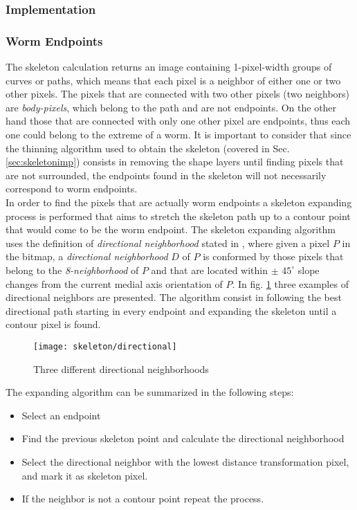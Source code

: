 \subsubsection{Implementation}
\label{segmentimp}


\subsubsection*{Worm Endpoints}
\label{sec:wend}
The skeleton calculation returns an image 
containing 1-pixel-width groups of curves or paths, which means that each pixel 
is a neighbor of either one or two other pixels. The pixels that are connected with 
two other pixels (two neighbors) are \emph{body-pixels}, which belong 
to the path and are not endpoints. On the other hand those that are connected with 
only one other pixel are endpoints, thus each one could belong to the extreme of a
worm. It is important to consider that since the thinning algorithm used to obtain
the skeleton (covered in Sec. \ref{sec:skeletonimp}) consists in removing the shape
layers until finding pixels that are not surrounded, the endpoints found in the
skeleton will not necessarily correspond to worm endpoints.\\

In order to find the pixels that are actually worm endpoints a skeleton expanding process
is performed that aims to stretch the skeleton path up to a contour point that 
would come to be the worm endpoint. The skeleton expanding algorithm uses the definition
of \emph{directional neighborhood} stated in \cite[p.334]{maxima}, where given 
a pixel $P$ in the bitmap, a \emph{directional neighborhood} $D$ of $P$ is 
conformed by those pixels that belong to the \emph{8-neighborhood} of $P$ and that
are located within $\pm$ $45^{\circ}$ slope changes from the current medial axis 
orientation of $P$. In fig. \ref{fig:directional} three examples of directional
neighbors are presented. The algorithm consist in following the best directional path
starting in every endpoint and expanding the skeleton until a contour pixel is found.
 
\begin{figure}[h t b p ! H]
 \centering
   \texttt{[image: skeleton/directional]}
 \caption{Three different directional neighborhoods}
 \label{fig:directional}
\end{figure}

The expanding algorithm can be summarized in the following steps:
\begin{itemize}
\item Select an endpoint
\item Find the previous skeleton point and calculate the directional neighborhood
\item Select the directional neighbor with the lowest distance transformation pixel,
  and mark it as skeleton pixel.
\item If the neighbor is not a contour point repeat the process.
\end{itemize}

